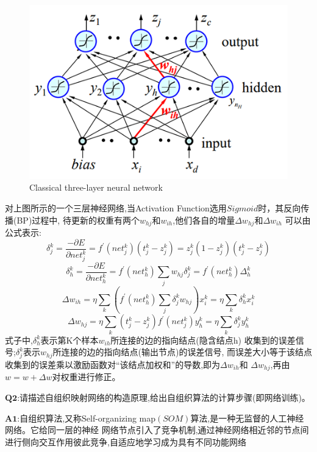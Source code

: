 \documentclass[homework]{IEEEtran}
\begin{document}
\begin{CJK}{UTF8}{gkai}
\begin{figure}[htb]
\centerline{\includegraphics{Images/fig1.jpg}}
\caption{Classical three-layer neural network}
\label{fig}
\end{figure}
对上图所示的一个三层神经网络,当Activation Function选用$Sigmoid$时，其反向传播(BP)过程中,
待更新的权重有两个$w_{hj}$和$w_{ih}$,他们各自的增量$\Delta w_{hj}$和$\Delta w_{ih}$
可以由公式表示:
$$
\delta_{j}^{k}=\frac{-\partial E}{\partial n e t_{j}^{k}}
=f^{\prime}\left(n e t_{j}^{k}\right)\left(t_{j}^{k}-z_{j}^{k}\right)
=z_{j}^{k}\left(1-z_{j}^{k}\right)\left(t_{j}^{k}-z_{j}^{k}\right)
$$
$$
\delta_{h}^{k}=\frac{-\partial E}{\partial n e t_{h}^{k}}
=f^{\prime}\left(n e t_{h}^{k}\right) \sum_{j} w_{h j} \delta_{j}^{k}
=f^{\prime}\left(n e t_{h}^{k}\right) \Delta_{h}^{k}
$$
$$
\Delta w_{ih}=\eta \sum_{k}\left(f^{\prime}\left(n e t_{h}^{k}\right) 
\sum_{j} \delta_{j}^{k} w_{h j}\right) x_{i}^{k}
=\eta \sum_{k} \delta_{h}^{k} x_{i}^{k}
$$
$$ 
\Delta w_{hj}=\eta \sum_{k}\left(t_{j}^{k}-z_{j}^{k}\right)
f^{\prime}\left(n e t_{j}^{k}\right) y_{h}^{k}
=\eta \sum_{k} \delta_{j}^{k} y_{h}^{k}
$$
式子中,$\delta_{h}^{k}$表示第K个样本$w_{ih}$所连接的边的指向结点(隐含结点h)
收集到的误差信号;$\delta_{j}^{k}$表示$w_{hj}$所连接的边的指向结点(输出节点)的误差信号,
而误差大小等于该结点收集到的误差乘以激励函数对“该结点加权和”的导数,即为$\Delta w_{ih}$和
$\Delta w_{hj}$,再由$w = w + \Delta w$对权重进行修正。
\par
$\mathbf{Q2}$:请描述自组织映射网络的构造原理,给出自组织算法的计算步骤(即网络训练)。\par
$\mathbf{A1}$:自组织算法,又称Self-organizing map$(SOM)$算法,是一种无监督的人工神经网络。它给同一层的神经
网络节点引入了竞争机制,通过神经网络相近邻的节点间进行侧向交互作用彼此竞争,自适应地学习成为具有不同功能网络

\end{CJK}
\end{document}
